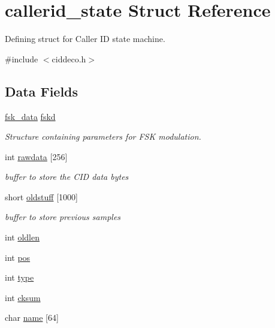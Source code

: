 \hypertarget{structcallerid__state}{}\section{callerid\+\_\+state Struct Reference}
\label{structcallerid__state}


Defining struct for Caller I\+D state machine.  




{\ttfamily \#include $<$ciddeco.\+h$>$}

\subsection*{Data Fields}
\begin{DoxyCompactItemize}
\item 
\hyperlink{structfsk__data}{fsk\+\_\+data} \hyperlink{structcallerid__state_a7a53484d75efb8c9b751f553766cbdf6}{fskd}
\begin{DoxyCompactList}\small\item\em Structure containing parameters for F\+S\+K modulation. \end{DoxyCompactList}\item 
int \hyperlink{structcallerid__state_a6a073312c8b127292ccd43573f46af1f}{rawdata} \mbox{[}256\mbox{]}
\begin{DoxyCompactList}\small\item\em buffer to store the C\+I\+D data bytes \end{DoxyCompactList}\item 
short \hyperlink{structcallerid__state_adab32a1be89ad9fac4a94bf77640d663}{oldstuff} \mbox{[}1000\mbox{]}
\begin{DoxyCompactList}\small\item\em buffer to store previous samples \end{DoxyCompactList}\item 
int \hyperlink{structcallerid__state_a39770e5775e3b30fd9b510b1354b13c3}{oldlen}
\item 
int \hyperlink{structcallerid__state_a31b48e329478cd345750fd5311a483f1}{pos}
\item 
int \hyperlink{structcallerid__state_a40a4612d818438947b0d8857fa86ef8e}{type}
\item 
int \hyperlink{structcallerid__state_a16e10e23fac23e09c68314e4115747e4}{cksum}
\item 
char \hyperlink{structcallerid__state_a521ec0abccd42445c58230ba7cb4856d}{name} \mbox{[}64\mbox{]}

\end{DoxyCompactItemize}
